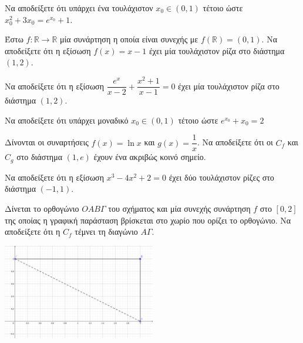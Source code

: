 \documentclass{presentation}
\begin{document}
\begin{askisi}
    Να αποδείξετε ότι υπάρχει ένα τουλάχιστον $x_0\in (0,1)$ τέτοιο ώστε $x_0^2+3x_0=e^{x_0}+1$.

\end{askisi}

\begin{askisi}
    Έστω $f:\mathbb{R}\to\mathbb{R}$ μία συνάρτηση η οποία είναι συνεχής με $f(\mathbb{R})=(0,1)$. Να αποδείξετε ότι η εξίσωση $f(x)=x-1$ έχει μία τουλάχιστον ρίζα στο διάστημα $(1,2)$.

\end{askisi}

\begin{askisi}
    Να αποδείξετε ότι η εξίσωση $\dfrac{e^x}{x-2}+\dfrac{x^2+1}{x-1}=0$ έχει μία τουλάχιστον ρίζα στο διάστημα $(1,2)$.

\end{askisi}

\begin{askisi}
    Να αποδείξετε ότι υπάρχει μοναδικό $x_0\in (0,1)$ τέτοιο ώστε $e^{x_0}+x_0=2$

\end{askisi}

\begin{askisi}
    Δίνονται οι συναρτήσεις $f(x)=\ln x$ και $g(x)=\dfrac{1}{x}$. Να αποδείξετε ότι οι $C_f$ και $C_g$ στο διάστημα $(1,e)$ έχουν ένα ακριβώς κοινό σημείο.

\end{askisi}

\begin{askisi}
    Να αποδείξετε ότι η εξίσωση $x^3-4x^2+2=0$ έχει δύο τουλάχιστον ρίζες στο διάστημα $(-1,1)$.

\end{askisi}

\begin{askisi}
    Δίνεται το ορθογώνιο $ΟΑΒΓ$ του σχήματος και μία συνεχής συνάρτηση $f$ στο $[0,2]$ της οποίας η γραφική παράσταση βρίσκεται στο χωρίο που ορίζει το ορθογώνιο. Να αποδείξετε ότι η $C_f$ τέμνει τη διαγώνιο $ΑΓ$.

    \centering
    \includegraphics[width=0.5\textwidth]{"images/Bolzano.png"}

\end{askisi}
\end{document}

